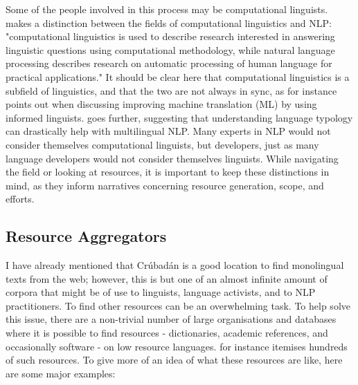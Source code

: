 Some of the people involved in this process may be computational linguists. \citet{bender2016linguistic} makes a distinction between the fields of computational linguistics and NLP: "computational linguistics is used to describe research interested in answering linguistic questions using computational methodology, while natural language processing describes research on automatic processing of human language for practical applications." It should be clear here that computational linguistics is a subfield of linguistics, and that the two are not always in sync, as for instance \citet{kay1997proper} points out when discussing improving machine translation (ML) by using informed linguists. \citet{bender2010grand, bender2016linguistic} goes further, suggesting that understanding language typology can drastically help with multilingual NLP. Many experts in NLP would not consider themselves computational linguists, but developers, just as many language developers would not consider themselves linguists. While navigating the field or looking at resources, it is important to keep these distinctions in mind, as they inform narratives concerning resource generation, scope, and efforts.

\subsection{Resource Aggregators}
\label{subsec:resource-aggregators}

I have already mentioned that Cr\'ubad\'an \citep{scannell2007crubadan} is a good location to find monolingual texts from the web; however, this is but one of an almost infinite amount of corpora that might be of use to linguists, language activists, and to NLP practitioners. To find other resources can be an overwhelming task. To help solve this issue, there are a non-trivial number of large organisations and databases where it is possible to find resources - dictionaries, academic references, and occasionally software - on low resource languages. \citet{unesco11directory} for instance itemises hundreds of such resources. To give more of an idea of what these resources are like, here are some major examples:

